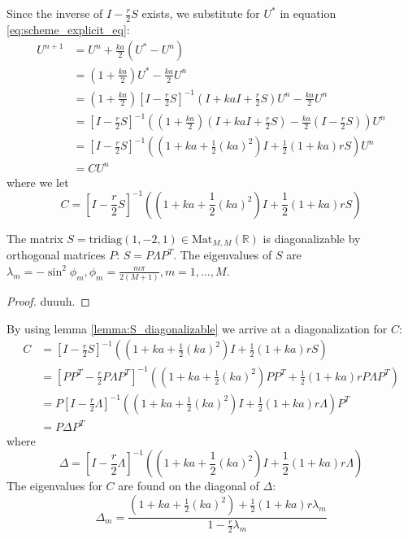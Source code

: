 Since the inverse of \( I - \frac{r}{2}S \) exists, we substitute for \( U^* \)
in equation \ref{eq:scheme_explicit_eq}:
\begin{align}
  U^{n+1} &= U^n + \frac{ka}{2}\left(U^*  - U^n\right) \\
          &= \left(1 + \frac{ka}{2}\right) U^* - \frac{ka}{2}U^n \\
          &= \left(1 + \frac{ka}{2}\right) {\left[I - \frac{r}{2}S\right]}^{-1} \left(I + kaI + \frac{r}{2}S\right) U^n - \frac{ka}{2}U^n \\
          &= {\left[I - \frac{r}{2}S\right]}^{-1} \left(\left(1 + \frac{ka}{2}\right)\left(I + kaI + \frac{r}{2}S\right) - \frac{ka}{2}\left(I-\frac{r}{2}S\right)\right) U^n \\
          &= {\left[I - \frac{r}{2}S\right]}^{-1} \left( \left(1+ka+\frac{1}{2}(ka)^2\right)I + \frac{1}{2}\left(1+ka\right)rS\right) U^n \\
          &= C U^n
\end{align}
where we let 
\begin{equation}
    C = {\left[I - \frac{r}{2}S\right]}^{-1} \left( \left(1+ka+\frac{1}{2}(ka)^2\right)I + \frac{1}{2}\left(1+ka\right)rS\right)
  \end{equation}

\begin{lemma}
  \label{lemma:S_diagonalizable}
  The matrix \( S = \text{tridiag}(1, -2, 1) \in \text{Mat}_{M, M}(\mathbb{R}) \)
  is diagonalizable by orthogonal matrices \( P \): \( S = P \Lambda P^T \).
  The eigenvalues of \( S \) are
  \( \lambda_m = - \sin^2 \phi_m, \phi_m = \frac{m \pi}{2(M+1)}, m = 1, \dots, M\).
\end{lemma}
\begin{proof}
    duuuh.
\end{proof}

By using lemma \ref{lemma:S_diagonalizable} we arrive at a diagonalization for \( C \):
\begin{align}
  C &= {\left[I - \frac{r}{2}S\right]}^{-1} \left( \left(1+ka+\frac{1}{2}(ka)^2\right)I + \frac{1}{2}\left(1+ka\right)rS\right) \\
    &= {\left[PP^T - \frac{r}{2}P\Lambda P^T\right]}^{-1} \left( \left(1+ka+\frac{1}{2}(ka)^2\right)PP^T + \frac{1}{2}\left(1+ka\right)r P\Lambda P^T\right) \\
    &= P{\left[I - \frac{r}{2}\Lambda \right]}^{-1} \left( \left(1+ka+\frac{1}{2}(ka)^2\right)I + \frac{1}{2}\left(1+ka\right)r \Lambda \right) P^T \\
    &= P \Delta P^T
\end{align}
where
\begin{equation}
    \Delta = {\left[I - \frac{r}{2}\Lambda \right]}^{-1} \left( \left(1+ka+\frac{1}{2}(ka)^2\right)I + \frac{1}{2}\left(1+ka\right)r \Lambda \right)
\end{equation}
The eigenvalues for \( C \) are found on the diagonal of \( \Delta \):
\begin{equation}
  \Delta_m =
      \frac{\left(1+ka+\frac{1}{2}(ka)^2\right) + \frac{1}{2}\left(1+ka\right)r \lambda_m}
      {1 - \frac{r}{2} \lambda_m}
\end{equation}


